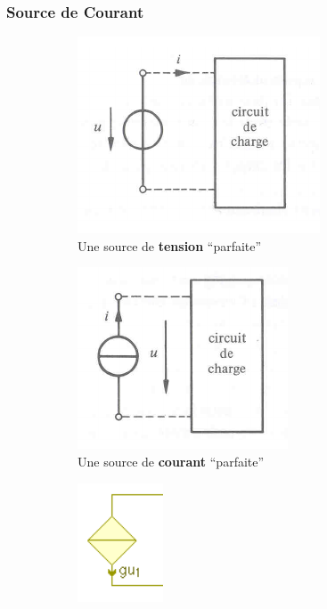 \documentclass[12pt,a4paper]{article}
\begin{document}
\subsubsection{Source de Courant}
\label{subsubsection: def source courant}
\begin{figure}
	\centering
	\captionsetup{justification=centering}		
	\begin{subfigure}[b]{0.27\textwidth}
		\captionsetup{justification=centering}	
		\centering
		\includegraphics[scale=0.65]{images/source_tension}
		\caption{Une source de \textbf{tension} ``parfaite''}
		\label{subfig: source de tension}
	\end{subfigure}
	\begin{subfigure}[b]{0.27\textwidth}
		\captionsetup{justification=centering}	
		\centering
		\includegraphics[scale=0.65]{images/source_courant}
		\caption{Une source de \textbf{courant} ``parfaite''}
		\label{subfig: source de courant}
	\end{subfigure}
	\begin{subfigure}[b]{0.27\textwidth}
		\captionsetup{justification=centering}	
		\centering
		\includegraphics[scale=0.65]{images/source_commandee}

\end{subfigure}
\end{figure}
\end{document}
